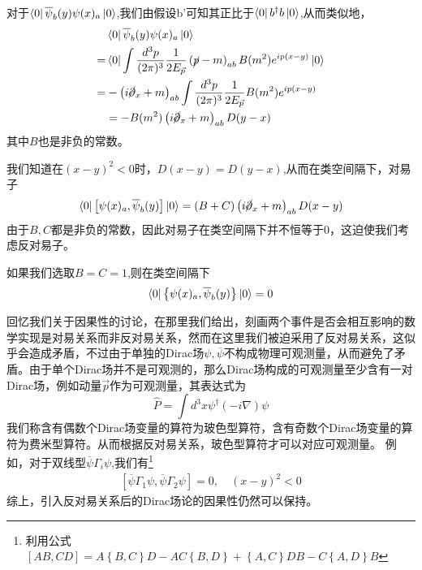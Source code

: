 对于$\bra{0}\overline{\psi}_{b}(y)\psi(x)_{a}\ket{0}$,我们由假设b'可知其正比于$\bra{0}b^{\dagger}b\ket{0}$,从而类似地，
\begin{equation}
    \begin{aligned}
       &\bra{0}\overline{\psi}_{b}(y)\psi(x)_{a}\ket{0}\\
       =&\bra{0}\int \frac{d^{3}p}{(2\pi)^{3}}\frac{1}{{2E_{\vec{p}}}}\left(\cancel{p}-m\right)_{ab}B(m^{2})e^{ip(x-y)} \ket{0}\\
       =&-\left(i\cancel{\partial}_{x}+m\right)_{ab}\int \frac{d^{3}p}{(2\pi)^{3}}\frac{1}{{2E_{\vec{p}}}}B(m^{2})e^{ip(x-y)}\\
       &=-B(m^{2})\left(i\cancel{\partial}_{x}+m\right)_{ab}D(y-x)
    \end{aligned}
\end{equation}
其中$B$也是非负的常数。

我们知道在$(x-y)^{2}<0$时，$D(x-y)=D(y-x)$,从而在类空间隔下，对易子
\begin{equation}
    \bra{0}\left[\psi(x)_{a},\overline{\psi}_{b}(y)\right]\ket{0}=(B+C)\left(i\cancel{\partial}_{x}+m\right)_{ab}D(x-y)
\end{equation}
由于$B,C$都是非负的常数，因此对易子在类空间隔下并不恒等于0，这迫使我们考虑反对易子。

如果我们选取$B=C=1$,则在类空间隔下
\begin{equation}
    \bra{0}\left\{\psi(x)_{a},\overline{\psi}_{b}(y)\right\}\ket{0}=0
\end{equation}

回忆我们关于因果性的讨论，在那里我们给出，刻画两个事件是否会相互影响的数学实现是对易关系而非反对易关系，然而在这里我们被迫采用了反对易关系，这似乎会造成矛盾，不过由于单独的Dirac场$\psi,\overline{\psi}$不构成物理可观测量，从而避免了矛盾。由于单个Dirac场并不是可观测的，那么Dirac场构成的可观测量至少含有一对Dirac场，例如动量$\vec{p}$作为可观测量，其表达式为
\begin{equation}
    \hat{P}=\int d^{3}x \psi^{\dagger}(-i\nabla)\psi
\end{equation}
我们称含有偶数个Dirac场变量的算符为玻色型算符，含有奇数个Dirac场变量的算符为费米型算符。从而根据反对易关系，玻色型算符才可以对应可观测量。
例如，对于双线型$\overline{\psi}\Gamma_{i}\psi$,我们有\footnote{利用公式$\left[AB,CD\right]=A\left\{B,C\right\}D-AC\left\{B,D\right\}+\left\{A,C\right\}DB-C\left\{A,D\right\}B$}
\begin{equation}
\begin{aligned}
\left[\overline{\psi}\Gamma_{1}\psi,\overline{\psi}\Gamma_{2}\psi\right]=0,\quad(x-y)^{2}<0
\end{aligned}
\end{equation}
综上，引入反对易关系后的Dirac场论的因果性仍然可以保持。

